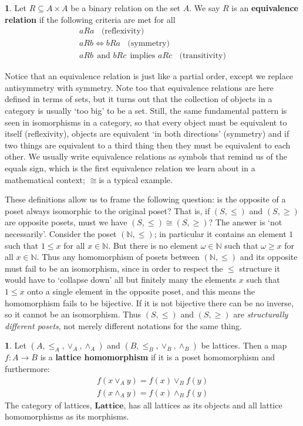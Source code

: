 \documentclass[oneside,english]{amsbook}
\numberwithin{section}{chapter}
\theoremstyle{plain}
\theoremstyle{definition}
\newtheorem{defn}[thm]{\protect\definitionname}
\providecommand{\definitionname}{Definition}
\begin{document}
\begin{defn} Let $R\subseteq A\times A$ be a binary relation on the set $A$. We say $R$ is an \textbf{equivalence relation} if the following criteria are met for all  
	\begin{multline*} 
		aRa\ \ \ \ \text{(reflexivity)}\\ 
		aRb\Leftrightarrow bRa\ \ \ \ \text{(symmetry)}\\ 
		aRb\ \ \text{and \ \ }bRc\ \ \text{implies \ \ }aRc\ \ \ \ \text{(transitivity)} 
	\end{multline*}
\end{defn} 

Notice that an equivalence relation is just like a partial order, except we replace antisymmetry with symmetry. Note too that equivalence relations are here defined in terms of sets, but it turns out that the collection of objects in a category is usually `too big' to be a set. Still, the same fundamental pattern is seen in isomorphisms in a category, so that every object must be equivalent to itself (reflexivity), objects are equivalent `in both directions' (symmetry) and if two things are equivalent to a third thing then they must be equivalent to each other. We usually write equivalence relations as symbols that remind us of the equals sign, which is the first equivalence relation we learn about in a mathematical context; $\cong$is a typical example.

These definitions allow us to frame the following question: is the opposite of a poset always isomorphic to the original poset? That is, if $(S,\le)$ and $(S,\ge)$ are opposite posets, must we have $(S,\le)\cong(S,\ge)$? The answer is `not necessarily'. Consider the poset $(\mathbb{N},\le)$; in particular it contains an element $1$ such that $1\le x$ for all $x\in\mathbb{N}$. But there is no element $\omega\in\mathbb{N}$ such that $\omega\ge x$ for all $x\in\mathbb{N}$. Thus any homomorphism of posets between $(\mathbb{N},\le)$ and its opposite must fail to be an isomorphism, since in order to respect the $\le$ structure it would have to `collapse down' all but finitely many the elements $x$ such that $1\le x$ onto a single element in the opposite poset, and this means the homomorphism fails to be bijective. If it is not bijective there can be no inverse, so it cannot be an isomorphism. Thus $(S,\le)$ and $(S,\ge)$ are \emph{structurally different posets}, not merely different notations for the same thing. 

\begin{defn} 
	Let $(A,\le_{A},\lor_{A},\land_{A})$ and $(B,\le_{B},\lor_{B},\land_{B})$ be lattices. Then a map $f:A\to B$ is a \textbf{lattice homomorphism} if it is a poset homomorphism and furthermore: 
		\begin{multline*} 
			f(x\lor_{A}y)=f(x)\lor_{B}f(y)\\ 
			f(x\land_{A}y)=f(x)\land_{B}f(y) 
		\end{multline*}
	The category of lattices, \textbf{$\mathbf{Lattice}$}, has all lattices as its objects and all lattice homomorphisms as its morphisms. 
\end{defn} 
\end{document}
